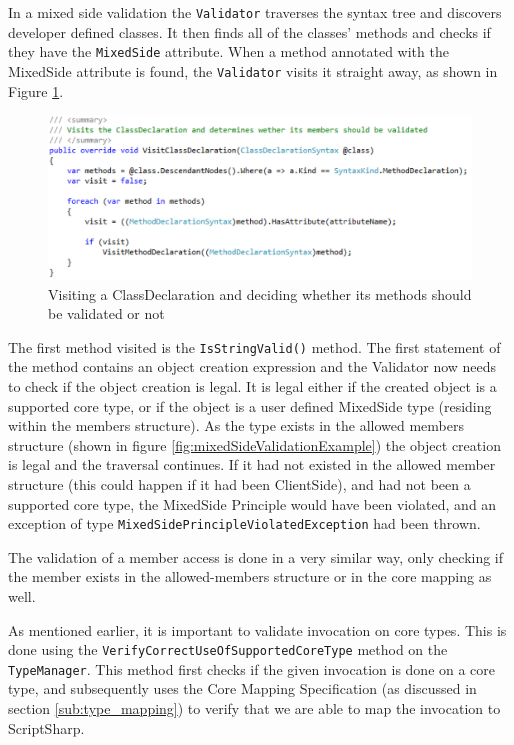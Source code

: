 In a mixed side validation the \texttt{Validator} traverses the syntax tree and discovers developer defined classes. It then finds all of the classes' methods and checks if they have the \texttt{MixedSide} attribute. When a method annotated with the MixedSide attribute is found, the \texttt{Validator} visits it straight away, as shown in Figure \ref{fig:ValidatorVisitClassDeclaration}. 

\begin{figure}[H]
	\begin{center}
		\centerline{\includegraphics[width=14cm]{resources/images/ValidatorVisitClassDeclaration.png}}
	\end{center}
	\caption{Visiting a ClassDeclaration and deciding whether its methods should be validated or not}
	\label{fig:ValidatorVisitClassDeclaration}
\end{figure}

The first method visited is the \texttt{IsStringValid()} method. The first statement of the method contains an object creation expression and the Validator now needs to check if the object creation is legal. It is legal either if the created object is a supported core type, or if the object is a user defined MixedSide type (residing within the members structure). As the type exists in the allowed members structure (shown in figure \ref{fig:mixedSideValidationExample}) the object creation is legal and the traversal continues. If it had not existed in the allowed member structure (this could happen if it had been ClientSide), and had not been a supported core type, the MixedSide Principle would have been violated, and an exception of type \texttt{MixedSidePrincipleViolatedException} had been thrown.

The validation of a member access is done in a very similar way, only checking if the member exists in the allowed-members structure or in the core mapping as well.

As mentioned earlier, it is important to validate invocation on core types. This is done using the \texttt{VerifyCorrectUseOfSupportedCoreType} method on the \texttt{TypeManager}. This method first checks if the given invocation is done on a core type, and subsequently uses the Core Mapping Specification (as discussed in section \ref{sub:type_mapping}) to verify that we are able to map the invocation to ScriptSharp.
		



